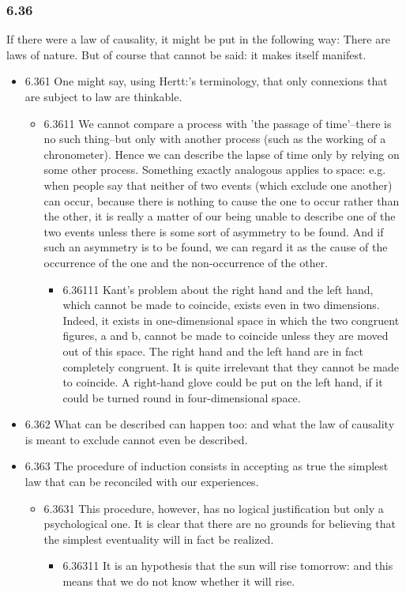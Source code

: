 \documentclass[11pt]{article}
\begin{document}
\subsubsection*{6.36}
\label{sec:orgf13a001}
If there were a law of causality, it might be put in the following
way: There are laws of nature. But of course that cannot be said: it makes
itself manifest.
\begin{itemize}
\item 6.361
\label{sec:org7070508}
One might say, using Hertt:'s terminology, that only connexions that
are subject to law are thinkable.
\begin{itemize}
\item 6.3611
\label{sec:orgf208f20}
We cannot compare a process with 'the passage of time'--there is no
such thing--but only with another process (such as the working of a
chronometer). Hence we can describe the lapse of time only by relying on
some other process. Something exactly analogous applies to space: e.g. when
people say that neither of two events (which exclude one another) can
occur, because there is nothing to cause the one to occur rather than the
other, it is really a matter of our being unable to describe one of the two
events unless there is some sort of asymmetry to be found. And if such an
asymmetry is to be found, we can regard it as the cause of the occurrence
of the one and the non-occurrence of the other.
\begin{itemize}
\item 6.36111
\label{sec:orgfad6c91}
Kant's problem about the right hand and the left hand, which cannot
be made to coincide, exists even in two dimensions. Indeed, it exists in
one-dimensional space in which the two congruent figures, a and b, cannot
be made to coincide unless they are moved out of this space. The right hand
and the left hand are in fact completely congruent. It is quite irrelevant
that they cannot be made to coincide. A right-hand glove could be put on
the left hand, if it could be turned round in four-dimensional space.
\end{itemize}
\end{itemize}
\item 6.362
\label{sec:org8e3ea92}
What can be described can happen too: and what the law of causality
is meant to exclude cannot even be described.
\item 6.363
\label{sec:orga4ea3e0}
The procedure of induction consists in accepting as true the simplest
law that can be reconciled with our experiences.
\begin{itemize}
\item 6.3631
\label{sec:org20f5f28}
This procedure, however, has no logical justification but only a
psychological one. It is clear that there are no grounds for believing that
the simplest eventuality will in fact be realized.
\begin{itemize}
\item 6.36311
\label{sec:orga59c670}
It is an hypothesis that the sun will rise tomorrow: and this means
that we do not know whether it will rise.
\end{itemize}
\end{itemize}
\end{itemize}
\end{document}
